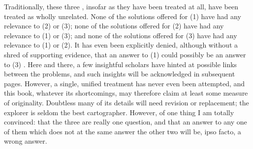 Traditionally, these three , insofar as they have been treated at all, have been treated as wholly unrelated. None of the solutions offered for (1) have had any relevance to (2) or (3); none of the solu\-tions offered for (2) have had any relevance to (1) or (3); and none of the solutions offered for (3) have had any relevance to (1) or (2). It has even been explicitly denied, although without a shred of support\-ing evidence, that an answer to (1) could possibly be an answer to (3) \citep{Sankoff1979}. Here and there, a few insightful scholars have hinted at possible links between the problems, and such insights will be ac\-knowledged in subsequent pages. However, a single, unified treatment has never even been attempted, and this book, whatever its short\-comings, may therefore claim at least some measure of originality. Doubtless many of its details will need revision or replacement; the explorer is seldom the best cartographer. However, of one thing I am totally convinced: that the three  are really one question, and that an answer to any one of them which does not at the same  answer the other two will be, ipso facto, a wrong answer.

